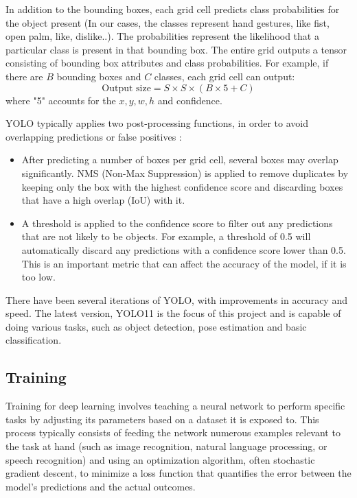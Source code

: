 \documentclass[12pt]{article}
\begin{document}
In addition to the bounding boxes, each grid cell predicts class probabilities for the object present (In our cases, the classes represent hand gestures, like fist, open palm, like, dislike..). The probabilities represent the likelihood that a particular class is present in that bounding box.
The entire grid outputs a tensor consisting of bounding box attributes and class probabilities. For example, if there are \(B\) bounding boxes and \(C\) classes, each grid cell can output:
\[
  \text{Output size} = S \times S \times (B \times 5 + C)
\]
where "5" accounts for the \(x, y, w, h\) and confidence.

YOLO typically applies two post-processing functions, in order to avoid overlapping predictions or false positives :
\begin{itemize}
  \item After predicting a number of boxes per grid cell, several boxes may overlap significantly. NMS (Non-Max Suppression) is applied to remove duplicates by keeping only the box with the highest confidence score and discarding boxes that have a high overlap (IoU) with it.
  \item A threshold is applied to the confidence score to filter out any predictions that are not likely to be objects. For example, a threshold of 0.5 will automatically discard any predictions with a confidence score lower than 0.5. This is an important metric that can affect the accuracy of the model, if it is too low.
\end{itemize}

There have been several iterations of YOLO, with improvements in accuracy and speed. The latest version, YOLO11 is the focus of this project and is capable of doing various tasks, such as object detection, pose estimation and basic classification.

\subsection{Training}

Training for deep learning involves teaching a neural network to perform specific tasks by adjusting its parameters based on a dataset it is exposed to. This process typically consists of feeding the network numerous examples relevant to the task at hand (such as image recognition, natural language processing, or speech recognition) and using an optimization algorithm, often stochastic gradient descent, to minimize a loss function that quantifies the error between the model's predictions and the actual outcomes.
\end{document}
